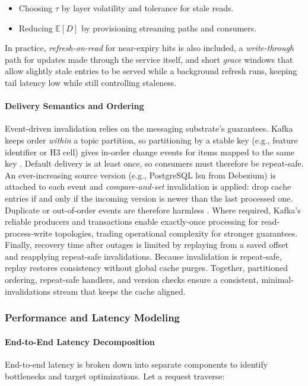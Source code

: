 \begin{itemize}
  \item Choosing $\tau$ by layer volatility and tolerance for stale reads.
  \item Reducing $\mathbb{E}[D]$ by provisioning streaming paths and consumers.
\end{itemize}

In practice, \emph{refresh-on-read} for near-expiry hits is also included, a \emph{write-through} path for updates made through the service itself, and short \emph{grace} windows that allow slightly stale entries to be served while a background refresh runs, keeping tail latency low while still controlling staleness.

\paragraph{Delivery Semantics and Ordering}
Event-driven invalidation relies on the messaging substrate's guarantees. Kafka keeps order \emph{within} a topic partition, so partitioning by a stable key (e.g., feature identifier or H3 cell) gives in-order change events for items mapped to the same key \cite{Kafka_Docs}. Default delivery is at least once, so consumers must therefore be repeat-safe. An ever-increasing source version (e.g., PostgreSQL \ac{lsn} from Debezium) is attached to each event and \emph{compare-and-set} invalidation is applied: drop cache entries if and only if the incoming version is newer than the last processed one. Duplicate or out-of-order events are therefore harmless \cite{Debezium_Postgres}. Where required, Kafka's reliable producers and transactions enable exactly-once processing for read-process-write topologies, trading operational complexity for stronger guarantees. Finally, recovery time after outages is limited by replaying from a saved offset and reapplying repeat-safe invalidations. Because invalidation is repeat-safe, replay restores consistency without global cache purges. Together, partitioned ordering, repeat-safe handlers, and version checks ensure a consistent, minimal-invalidations stream that keeps the cache aligned.

\subsubsection{Performance and Latency Modeling}

\paragraph{End-to-End Latency Decomposition}
End-to-end latency is broken down into separate components to identify bottlenecks and target optimizations. Let a request traverse:

